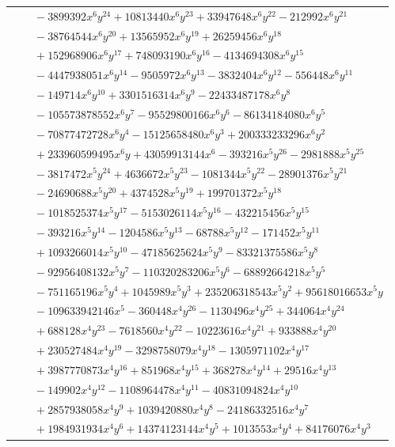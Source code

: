 \documentclass[11pt]{article}
\begin{document}
\begin{longtable}{@{}ll@{}}
 & $\quad -3899392x^{6}y^{24}+10813440x^{6}y^{23}+33947648x^{6}y^{22}-212992x^{6}y^{21}$\\
 & $\quad -38764544x^{6}y^{20}+13565952x^{6}y^{19}+26259456x^{6}y^{18}$\\
 & $\quad +152968906x^{6}y^{17}+748093190x^{6}y^{16}-4134694308x^{6}y^{15}$\\
 & $\quad -4447938051x^{6}y^{14}-9505972x^{6}y^{13}-3832404x^{6}y^{12}-556448x^{6}y^{11}$\\
 & $\quad -149714x^{6}y^{10}+3301516314x^{6}y^{9}-22433487178x^{6}y^{8}$\\
 & $\quad -105573878552x^{6}y^{7}-95529800166x^{6}y^{6}-86134184080x^{6}y^{5}$\\
 & $\quad -70877472728x^{6}y^{4}-15125658480x^{6}y^{3}+200333233296x^{6}y^{2}$\\
 & $\quad +233960599495x^{6}y+43059913144x^{6}-393216x^{5}y^{26}-2981888x^{5}y^{25}$\\
 & $\quad -3817472x^{5}y^{24}+4636672x^{5}y^{23}-1081344x^{5}y^{22}-28901376x^{5}y^{21}$\\
 & $\quad -24690688x^{5}y^{20}+4374528x^{5}y^{19}+199701372x^{5}y^{18}$\\
 & $\quad -1018525374x^{5}y^{17}-5153026114x^{5}y^{16}-432215456x^{5}y^{15}$\\
 & $\quad -393216x^{5}y^{14}-1204586x^{5}y^{13}-68788x^{5}y^{12}-171452x^{5}y^{11}$\\
 & $\quad +1093266014x^{5}y^{10}-47185625624x^{5}y^{9}-83321375586x^{5}y^{8}$\\
 & $\quad -92956408132x^{5}y^{7}-110320283206x^{5}y^{6}-68892664218x^{5}y^{5}$\\
 & $\quad -751165196x^{5}y^{4}+1045989x^{5}y^{3}+235206318543x^{5}y^{2}+95618016653x^{5}y$\\
 & $\quad -109633942146x^{5}-360448x^{4}y^{26}-1130496x^{4}y^{25}+344064x^{4}y^{24}$\\
 & $\quad +688128x^{4}y^{23}-7618560x^{4}y^{22}-10223616x^{4}y^{21}+933888x^{4}y^{20}$\\
 & $\quad +230527484x^{4}y^{19}-3298758079x^{4}y^{18}-1305971102x^{4}y^{17}$\\
 & $\quad +3987770873x^{4}y^{16}+851968x^{4}y^{15}+368278x^{4}y^{14}+29516x^{4}y^{13}$\\
 & $\quad -149902x^{4}y^{12}-1108964478x^{4}y^{11}-40831094824x^{4}y^{10}$\\
 & $\quad +2857938058x^{4}y^{9}+1039420880x^{4}y^{8}-24186332516x^{4}y^{7}$\\
 & $\quad +1984931934x^{4}y^{6}+14374123144x^{4}y^{5}+1013553x^{4}y^{4}+84176076x^{4}y^{3}$\\

\end{longtable}
\end{document}
